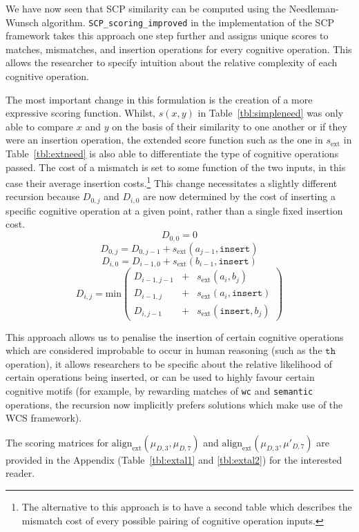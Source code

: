 We have now seen that SCP similarity can be computed using the Needleman-Wunsch algorithm. \texttt{SCP\_scoring\_improved} in the implementation of the SCP framework takes this approach one step further and assigns unique scores to matches, mismatches, and insertion operations for every cognitive operation. This allows the researcher to specify intuition about the relative complexity of each cognitive operation. 

The most important change in this formulation is the creation of a more expressive scoring function. Whilst, $s(x,y)$ in Table~\ref{tbl:simpleneed} was only able to compare $x$ and $y$ on the basis of their similarity to one another or if they were an insertion operation, the extended score function such as the one in $s_\text{ext}$ in Table~\ref{tbl:extneed} is also able to differentiate the type of cognitive operations passed. The cost of a mismatch is set to some function of the two inputs, in this case their average insertion costs.\footnote{The alternative to this approach is to have a second table which describes the mismatch cost of every possible pairing of cognitive operation inputs.} This change necessitates a slightly different recursion because $D_{0,j}$ and $D_{i,0}$ are now determined by the cost of inserting a specific cognitive operation at a given point, rather than a single fixed insertion cost.
\[
D_{0,0}=0
\]
\[
D_{0,j}=D_{0,j-1}+ s_\text{ext}(a_{j-1}, \texttt{insert})
\]
\[
D_{i,0}=D_{i-1,0}+s_\text{ext}(b_{i-1}, \texttt{insert})
\]
\[
D_{i,j}=\text{min}
\begin{pmatrix}
D_{i-1,j-1} & + & s_\text{ext}(a_i,b_j)\\
D_{i-1,j} & + & s_\text{ext}(a_i, \texttt{insert} )\\
D_{i,j-1} & + & s_\text{ext}(\texttt{insert},b_j)
\end{pmatrix}
\]

This approach allows us to penalise the insertion of certain cognitive operations which are considered improbable to occur in human reasoning (such as the $\texttt{th}$ operation), it allows researchers to be specific about the relative likelihood of certain operations being inserted, or can be used to highly favour certain cognitive motifs (for example, by rewarding matches of \texttt{wc} and \texttt{semantic} operations, the recursion now implicitly prefers solutions which make use of the WCS framework).

The scoring matrices for $\text{align}_\text{ext}(\mu_{D,3},\mu_{D,7})$ and $\text{align}_\text{ext}(\mu_{D,3},\mu'_{D,7})$ are provided in the Appendix (Table~\ref{tbl:extal1} and \ref{tbl:extal2}) for the interested reader.

